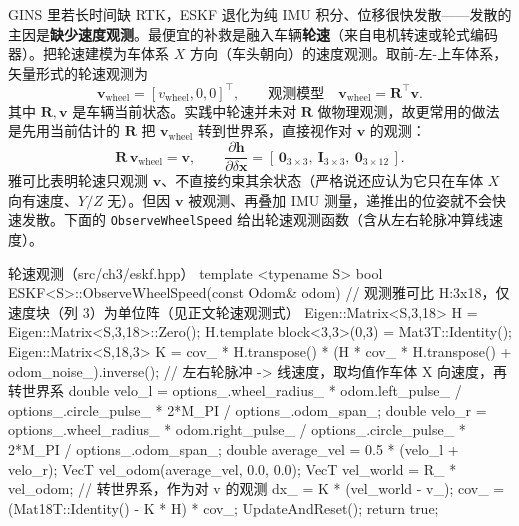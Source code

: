 GINS 里若长时间缺 RTK，ESKF 退化为纯 IMU 积分、位移很快发散——发散的主因是\textbf{缺少速度观测}\cite{gao2023slamad}。最便宜的补救是融入车辆\textbf{轮速}（来自电机转速或轮式编码器）。把轮速建模为车体系 $X$ 方向（车头朝向）的速度观测。取前-左-上车体系，矢量形式的轮速观测为
\begin{equation}
\label{eq:gins-wheel}
\mathbf{v}_{\text{wheel}}=[v_{\text{wheel}},0,0]^\top,\qquad\text{观测模型}\quad \mathbf{v}_{\text{wheel}}=\mathbf{R}^\top\mathbf{v}.
\end{equation}
其中 $\mathbf{R},\mathbf{v}$ 是车辆当前状态。实践中轮速并未对 $\mathbf{R}$ 做物理观测，故更常用的做法是先用当前估计的 $\mathbf{R}$ 把 $\mathbf{v}_{\text{wheel}}$ 转到世界系，直接视作对 $\mathbf{v}$ 的观测\cite{gao2023slamad}：
\begin{equation}
\label{eq:gins-wheel-world}
\mathbf{R}\,\mathbf{v}_{\text{wheel}}=\mathbf{v},\qquad
\frac{\partial\mathbf{h}}{\partial\delta\mathbf{x}}=[\,\mathbf{0}_{3\times3},\ \mathbf{I}_{3\times3},\ \mathbf{0}_{3\times12}\,].
\end{equation}
雅可比表明轮速只观测 $\mathbf{v}$、不直接约束其余状态（严格说还应认为它只在车体 $X$ 向有速度、$Y/Z$ 无）。但因 $\mathbf{v}$ 被观测、再叠加 IMU 测量，递推出的位姿就不会快速发散。下面的 \texttt{ObserveWheelSpeed} 给出轮速观测函数（含从左右轮脉冲算线速度）。

\begin{codebox}[C++]{轮速观测（src/ch3/eskf.hpp）}
template <typename S>
bool ESKF<S>::ObserveWheelSpeed(const Odom& odom) {
  // 观测雅可比 H:3x18，仅速度块（列 3）为单位阵（见正文轮速观测式）
  Eigen::Matrix<S,3,18> H = Eigen::Matrix<S,3,18>::Zero();
  H.template block<3,3>(0,3) = Mat3T::Identity();
  Eigen::Matrix<S,18,3> K = cov_ * H.transpose() * (H * cov_ * H.transpose() + odom_noise_).inverse();
  // 左右轮脉冲 -> 线速度，取均值作车体 X 向速度，再转世界系
  double velo_l = options_.wheel_radius_ * odom.left_pulse_  / options_.circle_pulse_ * 2*M_PI / options_.odom_span_;
  double velo_r = options_.wheel_radius_ * odom.right_pulse_ / options_.circle_pulse_ * 2*M_PI / options_.odom_span_;
  double average_vel = 0.5 * (velo_l + velo_r);
  VecT vel_odom(average_vel, 0.0, 0.0);
  VecT vel_world = R_ * vel_odom;            // 转世界系，作为对 v 的观测
  dx_  = K * (vel_world - v_);
  cov_ = (Mat18T::Identity() - K * H) * cov_;
  UpdateAndReset();
  return true;
}
\end{codebox}

